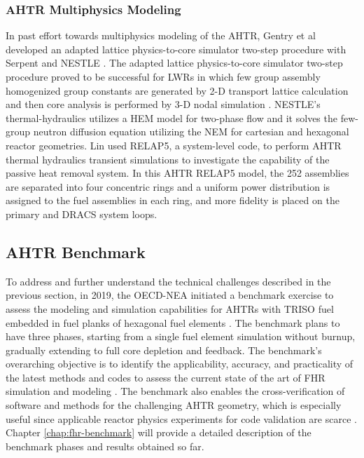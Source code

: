 \subsubsection{AHTR Multiphysics Modeling}
In past effort towards multiphysics modeling of the \gls{AHTR}, Gentry et al 
\cite{gentry_development_2016} developed an adapted lattice physics-to-core 
simulator two-step procedure with Serpent \cite{leppanen_serpent_2014} 
and \gls{NESTLE} \cite{turinsky_nestle_1994}. 
The adapted lattice physics-to-core simulator two-step procedure proved to be 
successful for \glspl{LWR} in which few group assembly homogenized group 
constants are generated by 2-D transport lattice calculation and then core 
analysis is performed by 3-D nodal simulation 
\cite{koebke_new_1980,gentry_development_2016}. 
\gls{NESTLE}'s thermal-hydraulics utilizes a \gls{HEM} model for two-phase 
flow and it solves the few-group neutron diffusion equation utilizing the
\gls{NEM} for cartesian and hexagonal reactor geometries.  
Lin \cite{lin_thermal_2020} used RELAP5, a system-level code, to perform 
\gls{AHTR} thermal hydraulics transient simulations to investigate the 
capability of the passive heat removal system. 
In this \gls{AHTR} RELAP5 model, the 252 assemblies are separated into four 
concentric rings and a uniform power distribution is assigned to the fuel 
assemblies in each ring, and more fidelity is placed on the primary and 
\gls{DRACS} system loops. 

\subsection{AHTR Benchmark}
To address and further understand the technical challenges described 
in the previous section, in 2019, the OECD-NEA initiated a benchmark exercise 
to assess the modeling and simulation capabilities for \glspl{AHTR} with 
\gls{TRISO} fuel embedded in fuel planks of hexagonal fuel elements
\cite{noauthor_fluoride_nodate}. 
The benchmark plans to have three phases, starting from a single fuel element 
simulation without burnup, gradually extending to full core depletion and feedback. 
The benchmark's overarching objective is to identify the applicability, accuracy, 
and practicality of the latest methods and codes to assess the current state 
of the art of FHR simulation and modeling \cite{petrovic_preliminary_2021}. 
The benchmark also enables the cross-verification of software and methods 
for the challenging \gls{AHTR} geometry, which is especially useful since 
applicable reactor physics experiments for code validation are scarce 
\cite{petrovic_fhrahtr_2019,petrovic_preliminary_2021}. 
Chapter \ref{chap:fhr-benchmark} will provide a detailed description of the 
benchmark phases and results obtained so far.

